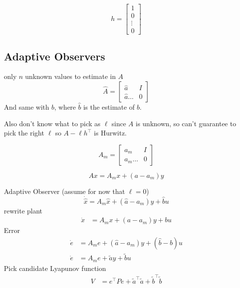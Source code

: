 \begin{equation*}
  h=
  \begin{bmatrix}
    1 \\ 0 \\ \vdots \\ 0
  \end{bmatrix}
\end{equation*}

\subsection{Adaptive Observers}


only $n$ unknown values to estimate in $A$
\begin{equation*}
  \hat{A}=
  \begin{bmatrix}
    \hat{a} & I \\
    \hat{a} \dots & 0
  \end{bmatrix}
\end{equation*}
And same with $b$, where $\hat{b}$ is the estimate of $b$.

Also don't know what to pick as $\ell$ since $A$ is unknown, so can't guarantee to pick the right $\ell$ so $A-\ell h^{\top}$ is Hurwitz.

\begin{equation*}
  A_{m}=
  \begin{bmatrix}
    a_{m} & I \\
    a_{m} \dots & 0
  \end{bmatrix}
\end{equation*}

\begin{equation*}
  Ax=A_{m}x+(a-a_{m})y
\end{equation*}

Adaptive Observer (assume for now that $\ell=0$)
\begin{equation*}
  \dot{\hat{x}}=A_{m}\hat{x}+(\hat{a}-a_{m})y+\hat{b}u
\end{equation*}
rewrite plant
\begin{align*}
  \dot{x}&=A_{m}x+(a-a_{m})y+bu
\end{align*}
Error
\begin{align*}
  \dot{e}&=A_{m}e+(\hat{a}-a_{m})y+(\hat{b}-b)u \\
  \dot{e}&=A_{m}e+\tilde{a}y+\tilde{b}u
\end{align*}
Pick candidate Lyapunov function
\begin{align*}
  V&=e^{\top}Pe+\tilde{a}^{\top}\tilde{a}+\tilde{b}^{\top}\tilde{b}
\end{align*}

